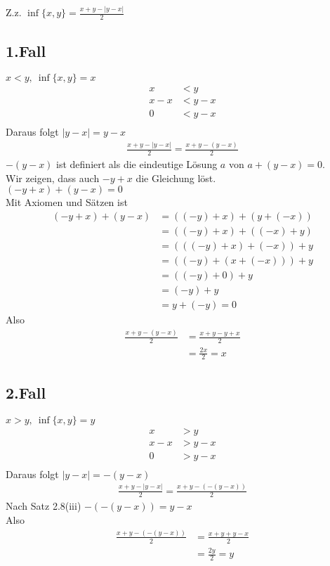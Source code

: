 \begin{lsg}
Z.z. $\inf\{x,y\}=\frac{x+y-|y-x|}{2}$ 
\subsection*{1.Fall} 
$x<y, \ \inf\{x,y\}=x$
\begin{align*}
    x&<y \\
    x-x&<y-x \\
    0&<y-x \\
\end{align*}
Daraus folgt $|y-x|=y-x$
\begin{align*}
    \frac{x+y-|y-x|}{2}=\frac{x+y-(y-x)}{2}
\end{align*}
$-(y-x)$ ist definiert als die eindeutige Lösung $a$ von $a+(y-x)=0$. \\
Wir zeigen, dass auch $-y+x$ die Gleichung löst.\\
$(-y+x)+(y-x)=0$\\
Mit Axiomen und Sätzen ist
\begin{align*}
    (-y+x)+(y-x)&=((-y)+x)+(y+(-x))\\
    &=((-y)+x)+((-x)+y)\\
    &=(((-y)+x)+(-x))+y\\
    &=((-y)+(x+(-x)))+y\\
    &=((-y)+0)+y\\
    &=(-y)+y\\
    &=y+(-y)=0
\end{align*}
Also
\begin{align*}
    \frac{x+y-(y-x)}{2}&=\frac{x+y-y+x}{2}\\
    &=\frac{2x}{2}=x
\end{align*}
\subsection*{2.Fall} 
$x>y, \ \inf\{x,y\}=y$
\begin{align*}
    x&>y \\
    x-x&>y-x \\
    0&>y-x \\
\end{align*}
Daraus folgt $|y-x|=-(y-x)$
\begin{align*}
    \frac{x+y-|y-x|}{2}=\frac{x+y-(-(y-x))}{2}
\end{align*}
Nach Satz 2.8(iii) $-(-(y-x))=y-x$\\
Also
\begin{align*}
    \frac{x+y-(-(y-x))}{2}&=\frac{x+y+y-x}{2}\\
    &=\frac{2y}{2}=y
\end{align*}

\end{lsg}
